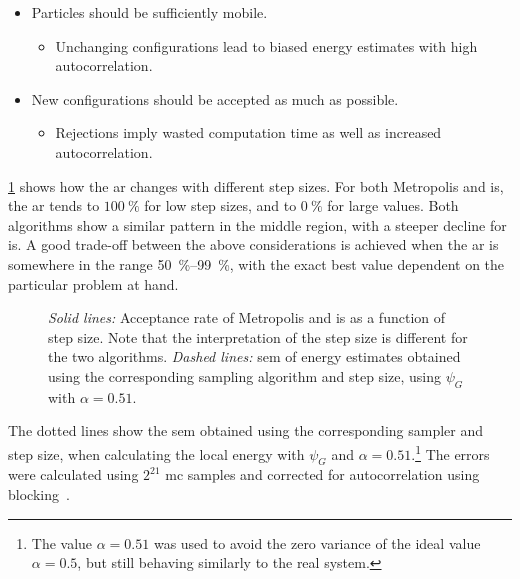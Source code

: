 \documentclass[Thesis.tex]{subfiles}
\begin{document}
\begin{itemize}
\item Particles should be sufficiently mobile.
  \begin{itemize}
  \item Unchanging configurations lead to biased energy estimates with high
    autocorrelation.
  \end{itemize}
\item New configurations should be accepted as much as possible.
  \begin{itemize}
  \item Rejections imply wasted computation time as well as increased autocorrelation.
  \end{itemize}
\end{itemize}


\cref{fig:verify-sampling-step} shows how the \gls{ar} changes with
different step sizes. For both Metropolis and \gls{is}, the \gls{ar} tends
to $\SI{100}{\percent}$ for low step sizes, and to $\SI{0}{\percent}$ for large
values. Both algorithms show a similar pattern in the middle region, with
a steeper decline for \gls{is}. A good trade-off between the above
considerations is achieved when the \gls{ar} is somewhere in the range
\SIrange{50}{99}{\percent}, with the exact best value dependent on the
particular problem at hand.

\begin{figure}[h]
  \centering
    \resizebox{\linewidth}{!}{%
      
    }
    \caption[Comparison of sampling strategies]{\label{fig:verify-sampling-step}\emph{Solid lines:} Acceptance rate of
    Metropolis and \gls{is} as a function of step size. Note that the
  interpretation of the step size is different for the two algorithms. \emph{Dashed
  lines:} \gls{sem} of energy estimates obtained using the corresponding
  sampling algorithm and step size, using $\psi_G$ with $\alpha=0.51$.}
\end{figure}


The dotted lines show the \gls{sem} obtained using the
corresponding sampler and step size, when calculating the local energy with
$\psi_G$ and $\alpha=0.51$.\footnote{The value $\alpha=0.51$ was used to avoid
  the zero variance of the ideal value $\alpha=0.5$, but still behaving
  similarly to the real system.} The errors were calculated using $2^{21}$ \gls{mc}
samples and corrected for autocorrelation using blocking~\cite{Jonsson-2018}.
\end{document}
